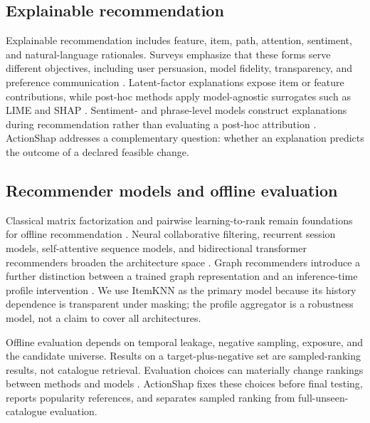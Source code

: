 \documentclass[pdflatex,sn-basic,Numbered]{sn-jnl}
\begin{document}
\subsection{Explainable recommendation}
Explainable recommendation includes feature, item, path, attention, sentiment, and natural-language rationales. Surveys emphasize that these forms serve different objectives, including user persuasion, model fidelity, transparency, and preference communication \citep{zhang2020survey}. Latent-factor explanations expose item or feature contributions, while post-hoc methods apply model-agnostic surrogates such as LIME and SHAP \citep{peake2018,nobrega2019,ribeiro2016,lundberg2017}. Sentiment- and phrase-level models construct explanations during recommendation rather than evaluating a post-hoc attribution \citep{zhang2014,zheng2018}. ActionShap addresses a complementary question: whether an explanation predicts the outcome of a declared feasible change.

\subsection{Recommender models and offline evaluation}
Classical matrix factorization and pairwise learning-to-rank remain foundations for offline recommendation \citep{koren2009,joachims2002,rendle2009,burges2005}. Neural collaborative filtering, recurrent session models, self-attentive sequence models, and bidirectional transformer recommenders broaden the architecture space \citep{he2017ncf,hidasi2016gru4rec,kang2018sasrec,sun2019bert4rec}. Graph recommenders introduce a further distinction between a trained graph representation and an inference-time profile intervention \citep{wang2019ngcf,he2020lightgcn}. We use ItemKNN as the primary model because its history dependence is transparent under masking; the profile aggregator is a robustness model, not a claim to cover all architectures.

Offline evaluation depends on temporal leakage, negative sampling, exposure, and the candidate universe. Results on a target-plus-negative set are sampled-ranking results, not catalogue retrieval. Evaluation choices can materially change rankings between methods and models \citep{harper2016,bennett2007,zheng2017,saito2021,ji2020,chen2022,mcnamara2017}. ActionShap fixes these choices before final testing, reports popularity references, and separates sampled ranking from full-unseen-catalogue evaluation.
\end{document}

